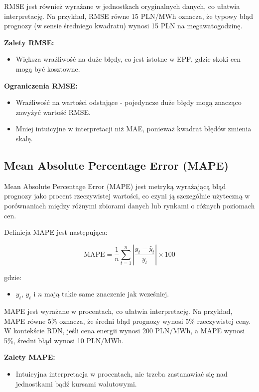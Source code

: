 RMSE jest również wyrażane w jednostkach oryginalnych danych, co ułatwia interpretację. Na przykład, RMSE równe 15 PLN/MWh oznacza, że typowy błąd prognozy (w sensie średniego kwadratu) wynosi 15 PLN na megawatogodzinę.

\textbf{Zalety RMSE:}
\begin{itemize}
    \item Większa wrażliwość na duże błędy, co jest istotne w EPF, gdzie skoki cen mogą być kosztowne.
\end{itemize}

\textbf{Ograniczenia RMSE:}
\begin{itemize}
    \item Wrażliwość na wartości odstające - pojedyncze duże błędy mogą znacząco zawyżyć wartość RMSE.
    \item Mniej intuicyjne w interpretacji niż MAE, ponieważ kwadrat błędów zmienia skalę.
\end{itemize}

\subsection{Mean Absolute Percentage Error (MAPE)}
\label{subsec:mape}

Mean Absolute Percentage Error (MAPE) jest metryką wyrażającą błąd prognozy jako procent rzeczywistej wartości, co czyni ją szczególnie użyteczną w porównaniach między różnymi zbiorami danych lub rynkami o różnych poziomach cen.

Definicja MAPE jest następująca:

\[
\text{MAPE} = \frac{1}{n} \sum_{t=1}^{n} \left| \frac{y_t - \hat{y}_t}{y_t} \right| \times 100
\]

gdzie:
\begin{itemize}
    \item \( y_t \), \( \hat{y}_t \) i \( n \) mają takie same znaczenie jak wcześniej.
\end{itemize}

MAPE jest wyrażane w procentach, co ułatwia interpretację. Na przykład, MAPE równe 5\% oznacza, że średni błąd prognozy wynosi 5\% rzeczywistej ceny. W kontekście RDN, jeśli cena energii wynosi 200 PLN/MWh, a MAPE wynosi 5\%, średni błąd wynosi 10 PLN/MWh.

\textbf{Zalety MAPE:}
\begin{itemize}
    \item Intuicyjna interpretacja w procentach, nie trzeba zastanawiać się nad jednostkami bądź kursami walutowymi.
\end{itemize}

